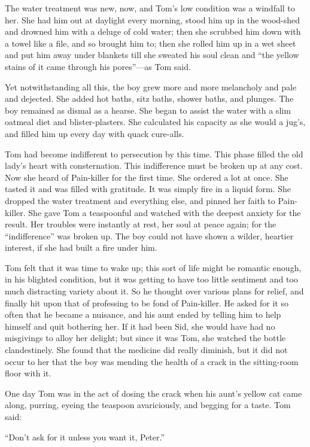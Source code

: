 \documentclass{book}
\begin{document}
The water treatment was new, now, and Tom’s low condition was a windfall to her. She had him out at daylight every morning, stood him up in the wood-shed and drowned him with a deluge of cold water; then she scrubbed him down with a towel like a file, and so brought him to; then she rolled him up in a wet sheet and put him away under blankets till she sweated his soul clean and “the yellow stains of it came through his pores”—as Tom said.

Yet notwithstanding all this, the boy grew more and more melancholy and pale and dejected. She added hot baths, sitz baths, shower baths, and plunges. The boy remained as dismal as a hearse. She began to assist the water with a slim oatmeal diet and blister-plasters. She calculated his capacity as she would a jug’s, and filled him up every day with quack cure-alls.

Tom had become indifferent to persecution by this time. This phase filled the old lady’s heart with consternation. This indifference must be broken up at any cost. Now she heard of Pain-killer for the first time. She ordered a lot at once. She tasted it and was filled with gratitude. It was simply fire in a liquid form. She dropped the water treatment and everything else, and pinned her faith to Pain-killer. She gave Tom a teaspoonful and watched with the deepest anxiety for the result. Her troubles were instantly at rest, her soul at peace again; for the “indifference” was broken up. The boy could not have shown a wilder, heartier interest, if she had built a fire under him.

Tom felt that it was time to wake up; this sort of life might be romantic enough, in his blighted condition, but it was getting to have too little sentiment and too much distracting variety about it. So he thought over various plans for relief, and finally hit upon that of professing to be fond of Pain-killer. He asked for it so often that he became a nuisance, and his aunt ended by telling him to help himself and quit bothering her. If it had been Sid, she would have had no misgivings to alloy her delight; but since it was Tom, she watched the bottle clandestinely. She found that the medicine did really diminish, but it did not occur to her that the boy was mending the health of a crack in the sitting-room floor with it.

One day Tom was in the act of dosing the crack when his aunt’s yellow cat came along, purring, eyeing the teaspoon avariciously, and begging for a taste. Tom said:

“Don’t ask for it unless you want it, Peter.”
\end{document}
